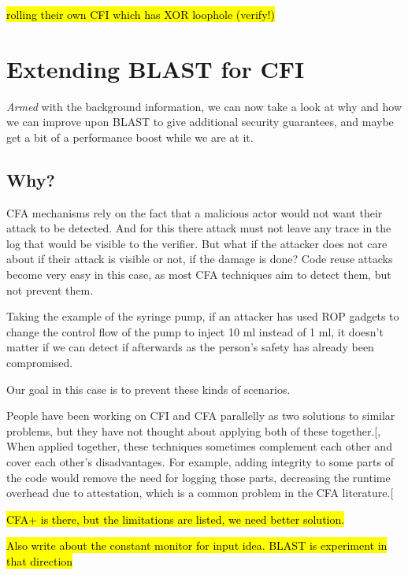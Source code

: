 \documentclass[a4paper, nobind]{templates/ociamthesis}
\begin{document}
\hl{rolling their own CFI which has XOR loophole (verify!)}

\chapter{Extending BLAST for CFI}\label{extending-blast-for-cfi}

\minitoc 

\emph{Armed} with the background information, we can now take a look at why and how we can improve
upon BLAST to give additional security guarantees, and maybe get a bit of a performance boost
while we are at it.

\section{Why?}\label{why-1}

CFA mechanisms rely on the fact that a malicious actor would not want their attack
to be detected. And for this there attack must not leave any trace in the log that
would be visible to the verifier. But what if the attacker does not care about if
their attack is visible or not, if the damage is done? Code reuse attacks become
very easy in this case, as most CFA techniques aim to detect them, but not prevent them.

Taking the example of the syringe pump, if an attacker has used ROP gadgets to
change the control flow of the pump to inject 10 ml instead of 1 ml, it doesn't
matter if we can detect if afterwards as the person's safety has already been compromised.

Our goal in this case is to prevent these kinds of scenarios.

People have been working on CFI and CFA parallelly as two solutions to similar
problems, but they have not thought about applying both of these together.{[}, \citeproc{ref-sok}{2}{]}
When applied together, these techniques sometimes complement each other and cover
each other's disadvantages. For example, adding integrity to some parts of the
code would remove the need for logging those parts, decreasing the runtime overhead
due to attestation, which is a common problem in the CFA literature.{[}\citeproc{ref-sok}{2}{]}

\hl{CFA+ is there, but the limitations are listed, we need better solution.}

\hl{Also write about the constant monitor for input idea. BLAST is experiment in that direction}
\end{document}
